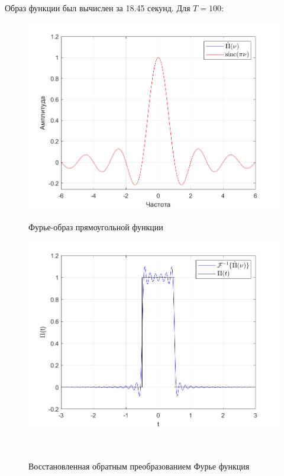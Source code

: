\documentclass[a4paper]{article}
\begin{document}
Образ функции был вычислен за 18.45 секунд. Для $T = 100$:

\begin{figure}[H]
    \begin{minipage}{0.5\textwidth}
        \centering \includegraphics[width=\textwidth]{graphs/1/T_100_dt_0.001_V_12_dv_0.001/fourier_numerical.png}
        \caption{Фурье-образ прямоугольной функции}
    \end{minipage}\hfill
    \begin{minipage}{0.5\textwidth}
        \centering \includegraphics[width=\textwidth]{graphs/1/T_100_dt_0.001_V_12_dv_0.001/func_inversed_fourier.png}
        \caption{Восстановленная обратным преобразованием Фурье функция}
    \end{minipage}\\[1em]
\end{figure}\noindent\
\end{document}
